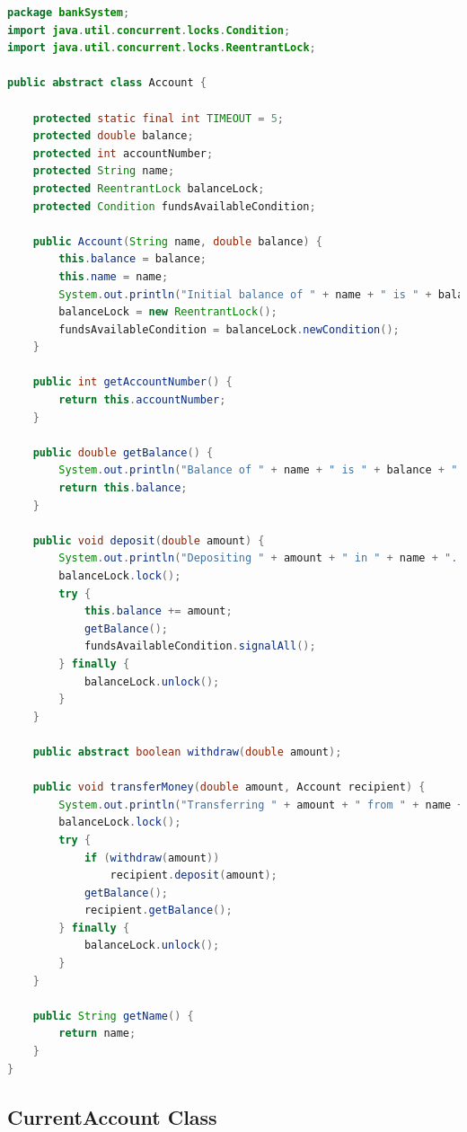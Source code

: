 \documentclass[a4paper,12pt]{article}
\begin{document}
\begin{lstlisting}[language=Java]
package bankSystem;
import java.util.concurrent.locks.Condition;
import java.util.concurrent.locks.ReentrantLock;

public abstract class Account {

	protected static final int TIMEOUT = 5;
	protected double balance;
	protected int accountNumber;
	protected String name;
	protected ReentrantLock balanceLock;
	protected Condition fundsAvailableCondition;

	public Account(String name, double balance) {
		this.balance = balance;
		this.name = name;
		System.out.println("Initial balance of " + name + " is " + balance + ".");
		balanceLock = new ReentrantLock();
        fundsAvailableCondition = balanceLock.newCondition();
	}

	public int getAccountNumber() {
		return this.accountNumber;
	}

	public double getBalance() {
		System.out.println("Balance of " + name + " is " + balance + ".");
		return this.balance;
	}

	public void deposit(double amount) {
		System.out.println("Depositing " + amount + " in " + name + "...");
		balanceLock.lock();
		try {
			this.balance += amount;
			getBalance();
			fundsAvailableCondition.signalAll();
		} finally {
			balanceLock.unlock();
		}
	}

	public abstract boolean withdraw(double amount);

	public void transferMoney(double amount, Account recipient) {
		System.out.println("Transferring " + amount + " from " + name + " to " + recipient.getName() + ":");
		balanceLock.lock();
		try {
			if (withdraw(amount))
				recipient.deposit(amount);
			getBalance();
			recipient.getBalance();
		} finally {
			balanceLock.unlock();
		}
	}

	public String getName() {
		return name;
	}
}
\end{lstlisting}


\subsection{CurrentAccount Class} \label{appendix:CurrentAccount}
\end{document}
